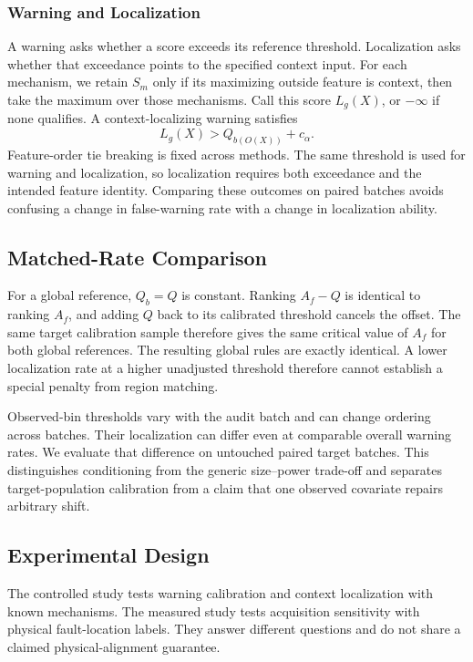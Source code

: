 \documentclass[conference]{IEEEtran}
\begin{document}
\subsubsection{Warning and Localization}
A warning asks whether a score exceeds its reference threshold. Localization asks whether that exceedance points to the specified context input. For each mechanism, we retain $S_m$ only if its maximizing outside feature is context, then take the maximum over those mechanisms. Call this score $L_g(X)$, or $-\infty$ if none qualifies. A context-localizing warning satisfies
\begin{equation}
 L_g(X)>Q_{b(O(X))}+c_\alpha.
 \label{eq:localization}
\end{equation}
Feature-order tie breaking is fixed across methods. The same threshold is used for warning and localization, so localization requires both exceedance and the intended feature identity. Comparing these outcomes on paired batches avoids confusing a change in false-warning rate with a change in localization ability.

\subsection{Matched-Rate Comparison}
For a global reference, $Q_b=Q$ is constant. Ranking $A_f-Q$ is identical to ranking $A_f$, and adding $Q$ back to its calibrated threshold cancels the offset. The same target calibration sample therefore gives the same critical value of $A_f$ for both global references. The resulting global rules are exactly identical. A lower localization rate at a higher unadjusted threshold therefore cannot establish a special penalty from region matching.

Observed-bin thresholds vary with the audit batch and can change ordering across batches. Their localization can differ even at comparable overall warning rates. We evaluate that difference on untouched paired target batches. This distinguishes conditioning from the generic size--power trade-off and separates target-population calibration from a claim that one observed covariate repairs arbitrary shift.

\subsection{Experimental Design}
\label{sec:design}
The controlled study tests warning calibration and context localization with known mechanisms. The measured study tests acquisition sensitivity with physical fault-location labels. They answer different questions and do not share a claimed physical-alignment guarantee.
\end{document}
